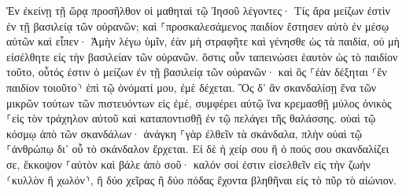 \documentclass{openreader}
\begin{document}
Ἐν ἐκείνῃ τῇ ὥρᾳ προσῆλθον οἱ μαθηταὶ τῷ Ἰησοῦ λέγοντες· Τίς ἄρα μείζων ἐστὶν ἐν τῇ βασιλείᾳ τῶν οὐρανῶν; 
καὶ ⸀προσκαλεσάμενος παιδίον ἔστησεν αὐτὸ ἐν μέσῳ αὐτῶν 
καὶ εἶπεν· Ἀμὴν λέγω ὑμῖν, ἐὰν μὴ στραφῆτε καὶ γένησθε ὡς τὰ παιδία, οὐ μὴ εἰσέλθητε εἰς τὴν βασιλείαν τῶν οὐρανῶν. 
ὅστις οὖν ταπεινώσει ἑαυτὸν ὡς τὸ παιδίον τοῦτο, οὗτός ἐστιν ὁ μείζων ἐν τῇ βασιλείᾳ τῶν οὐρανῶν· 
καὶ ὃς ⸀ἐὰν δέξηται ⸂ἓν παιδίον τοιοῦτο⸃ ἐπὶ τῷ ὀνόματί μου, ἐμὲ δέχεται. 
Ὃς δ’ ἂν σκανδαλίσῃ ἕνα τῶν μικρῶν τούτων τῶν πιστευόντων εἰς ἐμέ, συμφέρει αὐτῷ ἵνα κρεμασθῇ μύλος ὀνικὸς ⸀εἰς τὸν τράχηλον αὐτοῦ καὶ καταποντισθῇ ἐν τῷ πελάγει τῆς θαλάσσης. 
οὐαὶ τῷ κόσμῳ ἀπὸ τῶν σκανδάλων· ἀνάγκη ⸀γὰρ ἐλθεῖν τὰ σκάνδαλα, πλὴν οὐαὶ τῷ ⸀ἀνθρώπῳ δι’ οὗ τὸ σκάνδαλον ἔρχεται. 
Εἰ δὲ ἡ χείρ σου ἢ ὁ πούς σου σκανδαλίζει σε, ἔκκοψον ⸀αὐτὸν καὶ βάλε ἀπὸ σοῦ· καλόν σοί ἐστιν εἰσελθεῖν εἰς τὴν ζωὴν ⸂κυλλὸν ἢ χωλόν⸃, ἢ δύο χεῖρας ἢ δύο πόδας ἔχοντα βληθῆναι εἰς τὸ πῦρ τὸ αἰώνιον. 
\end{document}
